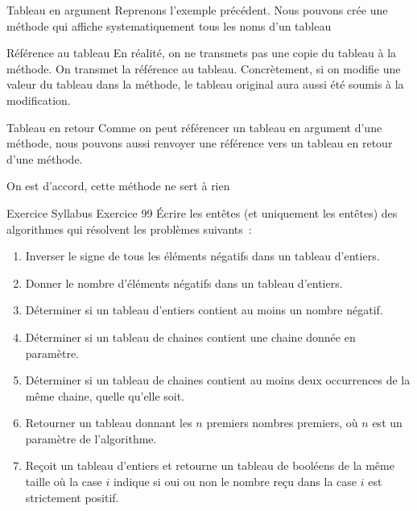 \begin{frame}{Tableau en argument}
    \pause
    Reprenons l'exemple précédent. Nous pouvons crée une méthode qui affiche systematiquement tous les noms d'un tableau
    

    \pause
    \begin{alertblock}{Référence au tableau}
        En réalité, on ne transmets pas une copie du tableau à la méthode. On transmet la référence au tableau.
        Concrètement, si on modifie une valeur du tableau dans la méthode,
        le tableau original aura aussi été soumis à la modification.
    \end{alertblock}
\end{frame}

\begin{frame}{Tableau en retour}
    \pause
    Comme on peut référencer un tableau en argument d'une méthode,
    nous pouvons aussi renvoyer une référence vers un tableau en retour d'une méthode.
    

    \pause
    \center\tiny On est d'accord, cette méthode ne sert à rien
\end{frame}

\begin{frame}[shrink]{Exercice \theexercice}{Syllabus Exercice 99}
    \pause
    Écrire les entêtes (et uniquement les entêtes)
    des algorithmes qui résolvent les problèmes suivants~:
    \begin{enumerate}
        \item\pause
        Inverser le signe de tous les éléments négatifs dans un tableau d’entiers.
        \item\pause
        Donner le nombre d’éléments négatifs dans un tableau d’entiers.
        \item\pause
        Déterminer si un tableau d’entiers contient au moins un nombre négatif.
        \item\pause
        Déterminer si un tableau de chaines contient
        une chaine donnée en paramètre.
        \item\pause
        Déterminer si un tableau de chaines contient
        au moins deux occurrences de la même chaine,
        quelle qu’elle soit.
        \item\pause
        Retourner un tableau donnant les $n$ premiers nombres premiers,
        où $n$ est un paramètre de l’algorithme.
        \item\pause
        Reçoit un tableau d’entiers
        et retourne un tableau de booléens de la même taille
        où la case $i$ indique si oui ou non
        le nombre reçu dans la case $i$ est strictement positif.
    \end{enumerate}
\end{frame}

